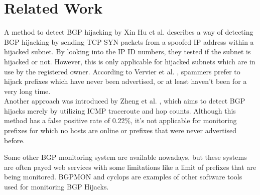 \section{Related Work}

A method to detect BGP hijacking by Xin Hu et al. \cite{hu2007accurate} describes a way of detecting BGP hijacking by sending TCP SYN packets from a spoofed IP address within a hijacked subnet. By looking into the IP ID numbers, they tested if the subnet is hijacked or not. However, this is only applicable for hijacked subnets which are in use by the registered owner. According to Vervier et al.
\cite{vervier2015mind}, spammers prefer to hijack prefixes which have never been advertised, or at least haven't been for a very long time.\\

Another approach was introduced by Zheng et al. \cite{zheng2007light}, which aims to detect BGP hijacks merely by utilizing ICMP traceroute and hop counts. Although this method has a false positive rate of 0.22\%, it's not applicable for monitoring prefixes for which no hosts are online or prefixes that were never advertised before.

Some other BGP monitoring system are available nowadays, but these systems are often payed web services with some limitations like a limit of prefixes that are being monitored. BGPMON and cyclops are examples of other software tools used for monitoring BGP Hijacks.

 
